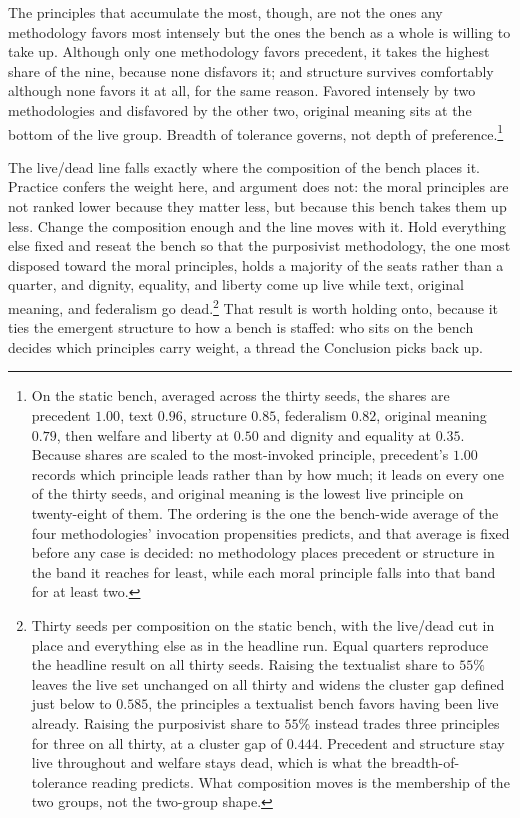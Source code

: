 The principles that accumulate the most, though, are not the ones any
methodology favors most intensely but the ones the bench as a whole is willing
to take up. Although only one methodology favors precedent, it takes the
highest share of the nine, because none disfavors it; and structure survives
comfortably although none favors it at all, for the same reason. Favored
intensely by two methodologies and disfavored by the other two, original
meaning sits at the bottom of the live group. Breadth of tolerance governs,
not depth of preference.\footnote{On the static bench, averaged across the thirty seeds,
the shares are precedent $1.00$, text $0.96$, structure $0.85$, federalism
$0.82$, original meaning $0.79$, then welfare and liberty at $0.50$ and
dignity and equality at $0.35$. Because shares are scaled to the most-invoked
principle, precedent's $1.00$ records which principle leads rather than by how
much; it leads on every one of the thirty seeds, and original meaning is the
lowest live principle on twenty-eight of them. The ordering is the one the
bench-wide average of the four methodologies' invocation propensities
predicts, and that average is fixed before any case is decided: no methodology
places precedent or structure in the band it reaches for least, while each
moral principle falls into that band for at least two.}

The live/dead line falls exactly where the
composition of the bench places it. Practice confers the weight here, and argument does
not: the moral principles
are not ranked lower because they matter less, but because this bench
takes them up less. Change the composition enough and the line moves with it.
Hold everything else fixed and reseat the bench so that the purposivist
methodology, the one most disposed toward the moral principles, holds a majority
of the seats rather than a quarter, and dignity, equality, and liberty come up
live while text, original meaning, and federalism go dead.\footnote{Thirty
seeds per composition on the static bench, with the live/dead cut in place and
everything else as in the headline run. Equal quarters reproduce the headline
result on all thirty seeds. Raising the textualist share to $55\%$ leaves the
live set unchanged on all thirty and widens the cluster gap defined just below
to $0.585$, the principles a textualist bench favors having been live already.
Raising the purposivist share to $55\%$ instead trades three principles for
three on all thirty, at a cluster gap of $0.444$. Precedent and structure stay live throughout and welfare stays
dead, which is what the breadth-of-tolerance reading predicts. What
composition moves is the membership of the two groups, not the two-group
shape.} That result is worth holding onto, because it ties the emergent
structure to how a bench is staffed: who sits on the bench decides which
principles carry weight, a thread the Conclusion picks back up.

